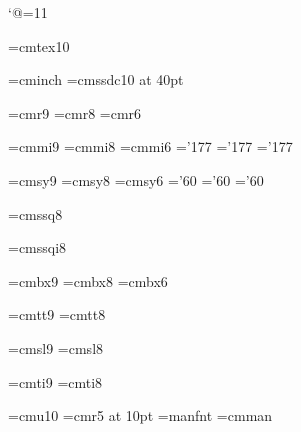 
\catcode`@=11 %

\font\tentex=cmtex10

\font\inchhigh=cminch
\font\titlefont=cmssdc10 at 40pt

\font\ninerm=cmr9
\font\eightrm=cmr8
\font\sixrm=cmr6

\font\ninei=cmmi9
\font\eighti=cmmi8
\font\sixi=cmmi6
\skewchar\ninei='177 \skewchar\eighti='177 \skewchar\sixi='177

\font\ninesy=cmsy9
\font\eightsy=cmsy8
\font\sixsy=cmsy6
\skewchar\ninesy='60 \skewchar\eightsy='60 \skewchar\sixsy='60

\font\eightss=cmssq8

\font\eightssi=cmssqi8

\font\ninebf=cmbx9
\font\eightbf=cmbx8
\font\sixbf=cmbx6

\font\ninett=cmtt9
\font\eighttt=cmtt8

\hyphenchar{} %
\hyphenchar{}
\hyphenchar{}

\font\ninesl=cmsl9
\font\eightsl=cmsl8

\font\nineit=cmti9
\font\eightit=cmti8

\font\tenu=cmu10 %
\font\magnifiedfiverm=cmr5 at 10pt
\font\manual=manfnt %
\font\cmman=cmman %

\newskip\ttglue
\def\tenpoint{\def\rm{\fam0\tenrm}%
  \textfont0=\tenrm \scriptfont0=\sevenrm \scriptscriptfont0=\fiverm
  \textfont1=\teni \scriptfont1=\seveni \scriptscriptfont1=\fivei
  \textfont2=\tensy \scriptfont2=\sevensy \scriptscriptfont2=\fivesy
  \textfont3=\tenex \scriptfont3=\tenex \scriptscriptfont3=\tenex
  \def\it{\fam\itfam\tenit}%
  \textfont\itfam=\tenit
  \def\sl{\fam\slfam\tensl}%
  \textfont\slfam=\tensl
  \def\bf{\fam\bffam\tenbf}%
  \textfont\bffam=\tenbf \scriptfont\bffam=\sevenbf
   \scriptscriptfont\bffam=\fivebf
  \def\tt{\fam\ttfam\tentt}%
  \textfont\ttfam=\tentt
  \tt \ttglue=.5em plus.25em minus.15em
  \normalbaselineskip=12pt
  \def\MF{{\manual META}\-{\manual FONT}}%
  \let\sc=\eightrm
  \let\big=\tenbig
  \setbox\strutbox=\hbox{\vrule height8.5pt depth3.5pt width\z@}%
  \normalbaselines\rm}

\def\ninepoint{\def\rm{\fam0\ninerm}%
  \textfont0=\ninerm \scriptfont0=\sixrm \scriptscriptfont0=\fiverm
  \textfont1=\ninei \scriptfont1=\sixi \scriptscriptfont1=\fivei
  \textfont2=\ninesy \scriptfont2=\sixsy \scriptscriptfont2=\fivesy
  \textfont3=\tenex \scriptfont3=\tenex \scriptscriptfont3=\tenex
  \def\it{\fam\itfam\nineit}%
  \textfont\itfam=\nineit
  \def\sl{\fam\slfam\ninesl}%
  \textfont\slfam=\ninesl
  \def\bf{\fam\bffam\ninebf}%
  \textfont\bffam=\ninebf \scriptfont\bffam=\sixbf
   \scriptscriptfont\bffam=\fivebf
  \def\tt{\fam\ttfam\ninett}%
  \textfont\ttfam=\ninett
  \tt \ttglue=.5em plus.25em minus.15em
  \normalbaselineskip=11pt
  \def\MF{{\manual hijk}\-{\manual lmnj}}%
  \let\sc=\sevenrm
  \let\big=\ninebig
  \setbox\strutbox=\hbox{\vrule height8pt depth3pt width\z@}%
  \normalbaselines\rm}

